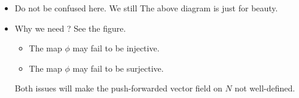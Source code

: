 \documentclass{article}
\begin{document}
\begin{enumerate}
\begin{itemize}
\item Do not be confused here. We still  The above diagram is just for beauty.
    \item Why we need ? See the figure.
        \begin{itemize}[$\ast$]
    \item The map $\phi$ may fail to be injective.
    \item The map $\phi$ may fail to be surjective. 
\end{itemize}
Both issues will make the push-forwarded vector field on $N$ not well-defined.
\begin{figure}[H]
    \centering
{} %

\begin{tikzpicture}[x=0.75pt,y=0.75pt,yscale=-1,xscale=1]


\end{tikzpicture}
\end{figure}
\end{itemize}
\end{enumerate}
\end{document}
